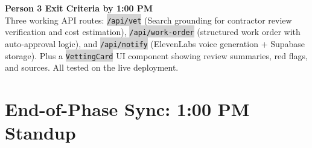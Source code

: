 \documentclass[11pt, a4paper]{article}
\newcommand{\code}[1]{\texttt{\small\colorbox{lightgray}{#1}}}
\begin{document}
\vspace{0.5em}

\begin{milestonebox}
\textbf{Person 3 Exit Criteria by 1:00 PM}\\[4pt]
Three working API routes: \code{/api/vet} (Search grounding for contractor review verification and cost estimation), \code{/api/work-order} (structured work order with auto-approval logic), and \code{/api/notify} (ElevenLabs voice generation + Supabase storage). Plus a \code{VettingCard} UI component showing review summaries, red flags, and sources. All tested on the live deployment.
\end{milestonebox}

\newpage

\section{End-of-Phase Sync: 1:00 PM Standup}
\end{document}
